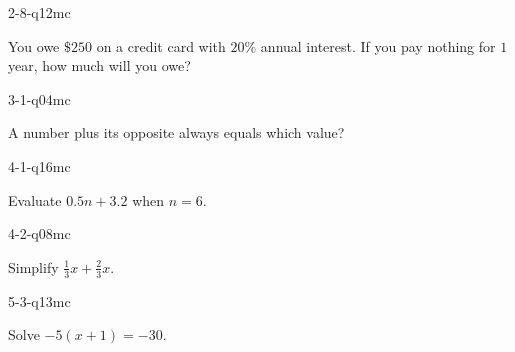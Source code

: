 \begin{practiceQuestion}{2-8-q12}{mc}
\begin{questionText}
You owe $\$250$ on a credit card with $20\%$ annual interest. If you pay nothing for $1$ year, how much will you owe?
\end{questionText}
\end{practiceQuestion}

\begin{practiceQuestion}{3-1-q04}{mc}
\begin{questionText}
A number plus its opposite always equals which value?
\end{questionText}
\end{practiceQuestion}

\begin{practiceQuestion}{4-1-q16}{mc}
\begin{questionText}
Evaluate $0.5n + 3.2$ when $n = 6$.
\end{questionText}
\end{practiceQuestion}

\begin{practiceQuestion}{4-2-q08}{mc}
\begin{questionText}
Simplify $\frac{1}{3}x + \frac{2}{3}x$.


\begin{center}
\hspace{1cm}
\end{center}
\end{questionText}
\end{practiceQuestion}

\begin{practiceQuestion}{5-3-q13}{mc}
\begin{questionText}
Solve $-5(x + 1) = -30$.
\end{questionText}
\end{practiceQuestion}

